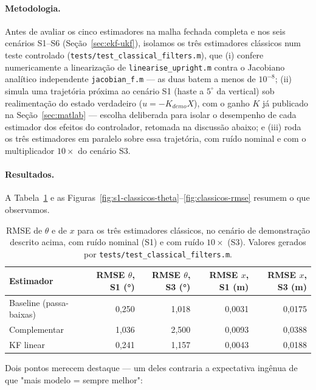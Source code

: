 \documentclass[brazil, 12pt]{article}
\begin{document}
\paragraph{Metodologia.} Antes de avaliar os cinco estimadores na malha
fechada completa e nos seis cenários S1--S6 (Seção~\ref{sec:ekf-ukf}), isolamos
os três estimadores clássicos num teste controlado
(\texttt{tests/test\_classical\_filters.m}), que (i) confere numericamente a
linearização de \texttt{linearise\_upright.m} contra o Jacobiano analítico
independente \texttt{jacobian\_f.m} --- as duas batem a menos de $10^{-8}$;
(ii) simula uma trajetória próxima ao cenário S1 (haste a $5^{\circ}$ da
vertical) sob realimentação do estado verdadeiro ($u=-K_{demo}X$), com o ganho
$K$ já publicado na Seção~\ref{sec:matlab} --- escolha deliberada para isolar
o desempenho de cada estimador dos efeitos do controlador, retomada na
discussão abaixo; e (iii) roda os três estimadores em paralelo sobre essa
trajetória, com ruído nominal e com o multiplicador $10\times$ do cenário S3.

\paragraph{Resultados.} A Tabela~\ref{tab:rmse-classicos} e as
Figuras~\ref{fig:s1-classicos-theta}--\ref{fig:classicos-rmse} resumem o que
observamos.

\begin{table}[H]
\centering
\small
\begin{tabular}{@{}l r r r r@{}}
\hline
\textbf{Estimador} & \textbf{RMSE $\theta$, S1 (°)} & \textbf{RMSE $\theta$, S3 (°)} & \textbf{RMSE $x$, S1 (m)} & \textbf{RMSE $x$, S3 (m)} \\
\hline
Baseline (passa-baixas) & 0,250 & 1,018 & 0,0031 & 0,0175 \\
Complementar             & 1,036 & 2,500 & 0,0093 & 0,0388 \\
KF linear                & 0,241 & 1,157 & 0,0043 & 0,0188 \\
\hline
\end{tabular}
\caption{RMSE de $\theta$ e de $x$ para os três estimadores clássicos, no
cenário de demonstração descrito acima, com ruído nominal (S1) e com
ruído $10\times$ (S3). Valores gerados por
\texttt{tests/test\_classical\_filters.m}.}
\label{tab:rmse-classicos}
\end{table}

Dois pontos merecem destaque --- um deles contraria a expectativa ingênua de
que "mais modelo = sempre melhor":
\end{document}
